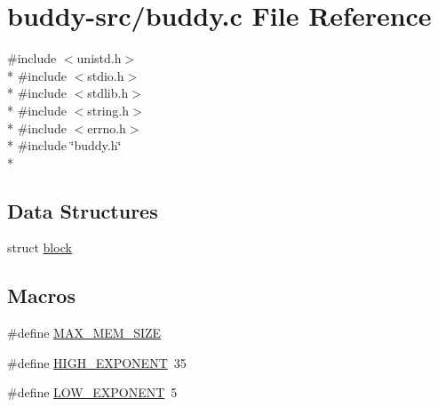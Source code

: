 \hypertarget{buddy-src_2buddy_8c}{}\section{buddy-\/src/buddy.c File Reference}
\label{buddy-src_2buddy_8c}
{\ttfamily \#include $<$unistd.\+h$>$}\\*
{\ttfamily \#include $<$stdio.\+h$>$}\\*
{\ttfamily \#include $<$stdlib.\+h$>$}\\*
{\ttfamily \#include $<$string.\+h$>$}\\*
{\ttfamily \#include $<$errno.\+h$>$}\\*
{\ttfamily \#include \char`\"{}buddy.\+h\char`\"{}}\\*
\subsection*{Data Structures}
\begin{DoxyCompactItemize}
\item 
struct \hyperlink{structblock}{block}
\end{DoxyCompactItemize}
\subsection*{Macros}
\begin{DoxyCompactItemize}
\item 
\#define \hyperlink{buddy-src_2buddy_8c_af218d6522bd0cecd74df71aca18a7893}{M\+A\+X\+\_\+\+M\+E\+M\+\_\+\+S\+I\+Z\+E}
\item 
\#define \hyperlink{buddy-src_2buddy_8c_a74799bfafd636c36aeaed4c045acb907}{H\+I\+G\+H\+\_\+\+E\+X\+P\+O\+N\+E\+N\+T}~35
\item 
\#define \hyperlink{buddy-src_2buddy_8c_ada63ed810b616bbac2aa6a145720a3df}{L\+O\+W\+\_\+\+E\+X\+P\+O\+N\+E\+N\+T}~5
\end{DoxyCompactItemize}
